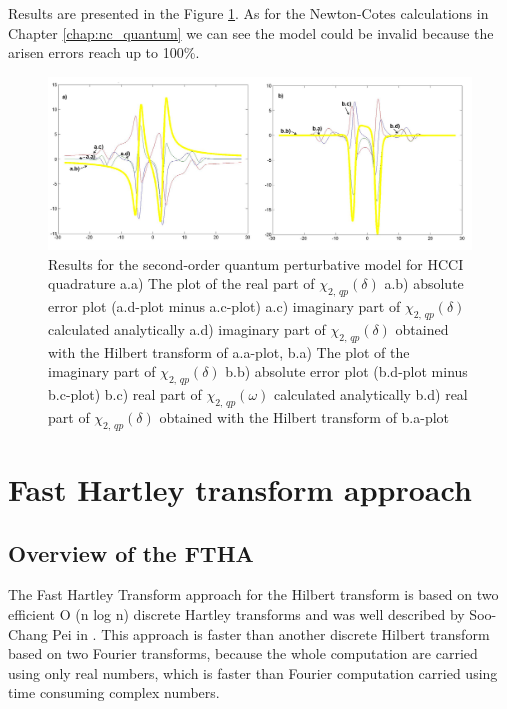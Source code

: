 \documentclass[12pt,twoside,a4paper]{article}
\numberwithin{equation}{subsection}
\numberwithin{figure}{subsection}
\begin{document}
Results are presented in the Figure \ref{fig:hcc_qp2}. As for the Newton-Cotes calculations in Chapter \ref{chap:nc_quantum} we can
see the model could be invalid because the arisen errors reach up to 100\%. 

\begin{figure} 
  \includegraphics[width=150mm]{img/hcc_qp2.png}
  \caption{Results for the second-order quantum perturbative model for HCCI quadrature
     a.a) The plot of the real part of ${\chi_{2, \,qp}}(\delta )$
     a.b) absolute error plot (a.d-plot minus a.c-plot) 
     a.c) imaginary part of ${\chi_{2, \,qp}}(\delta )$ calculated analytically 
     a.d) imaginary part of ${\chi_{2, \,qp}}(\delta )$ obtained with the Hilbert transform of a.a-plot, 
     b.a) The plot of the imaginary part of ${\chi_{2, \,qp}}(\delta )$ 
     b.b) absolute error plot (b.d-plot minus b.c-plot) 
     b.c) real part of $\chi_{2, \,qp} (\omega )$ calculated analytically 
     b.d) real part of ${\chi_{2, \,qp}}(\delta )$ obtained with the Hilbert transform of b.a-plot 
     \label{fig:hcc_qp2}
     }
\end{figure}


\section{Fast Hartley transform approach} \label{chap:hartley}

\subsection{Overview of the FTHA} \label{chap:hartley_overview}

The Fast Hartley Transform approach for the Hilbert transform is based on two efficient O (n log n) discrete Hartley transforms and
was well described by Soo-Chang Pei in \cite{chang_computation}. This approach is faster than another discrete Hilbert transform
based on two Fourier transforms, because the whole computation are carried using only real numbers, which is faster than Fourier
computation carried using time consuming complex numbers.
\end{document}
